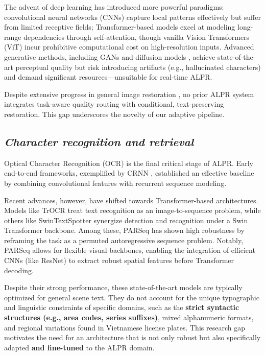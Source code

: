 \documentclass[a4paper,11pt,twocolumn]{article}
\begin{document}
	The advent of deep learning has introduced more powerful paradigms: convolutional neural networks (CNNs) \cite{liu2024,singhal2025} capture local patterns effectively but suffer from limited receptive fields; Transformer-based models \cite{liang2021swinir, agnolucci2022, conde2022swin2sr, singhal2025} excel at modeling long-range dependencies through self-attention, though vanilla Vision Transformers (ViT) incur prohibitive computational cost on high-resolution inputs. Advanced generative methods, including GANs and diffusion models \cite{singhal2025}, achieve state-of-the-art perceptual quality but risk introducing artifacts (e.g., hallucinated characters) and demand significant resources—unsuitable for real-time ALPR.
	
	Despite extensive progress in general image restoration \cite{singhal2025}, no prior ALPR system integrates task-aware quality routing with conditional, text-preserving restoration. This gap underscores the novelty of our adaptive pipeline.
	
	\subsection{\textit{Character recognition and retrieval}}
	\label{related_m4}
	
	Optical Character Recognition (OCR) is the final critical stage of ALPR. Early end-to-end frameworks, exemplified by CRNN \cite{Shi2015AnET}, established an effective baseline by combining convolutional features with recurrent sequence modeling.
	
	Recent advances, however, have shifted towards Transformer-based architectures. Models like TrOCR \cite{Li2021TrOCRTO} treat text recognition as an image-to-sequence problem, while others like SwinTextSpotter \cite{Huang2022SwinTextSpotterST} synergize detection and recognition under a Swin Transformer backbone. Among these, PARSeq \cite{Bautista2022SceneTR} has shown high robustness by reframing the task as a permuted autoregressive sequence problem. Notably, PARSeq allows for flexible visual backbones, enabling the integration of efficient CNNs (like ResNet) to extract robust spatial features before Transformer decoding.
	
	Despite their strong performance, these state-of-the-art models are typically optimized for general scene text. They do not account for the unique typographic and linguistic constraints of specific domains, such as the \textbf{strict syntactic structures (e.g., area codes, series suffixes)}, mixed alphanumeric formats, and regional variations found in Vietnamese license plates. This research gap motivates the need for an architecture that is not only robust but also specifically adapted \textbf{and fine-tuned} to the ALPR domain.
	
\end{document}
